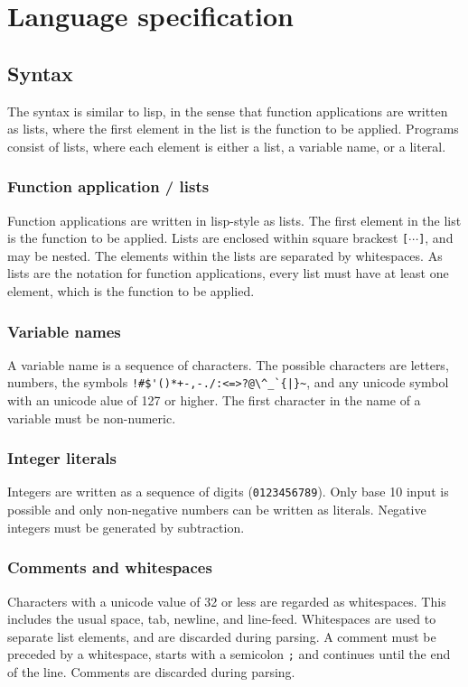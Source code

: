 \documentclass[11pt]{report}
\begin{document}
\section{Language specification}

\subsection{Syntax}
The syntax is similar to lisp, in the sense that function applications are written as lists, where the first element in the list is the function to be applied.
Programs consist of lists, where each element is either a list, a variable name, or a literal.

\subsubsection{Function application / lists}
Function applications are written in lisp-style as lists. The first element in the list is the function to be applied.
Lists are enclosed within square brackest \verb|[|$\cdots$\verb|]|, and may be nested. The elements within the lists are separated by whitespaces. 
As lists are the notation for function applications, every list must have at least one element, which is the function to be applied.

\subsubsection{Variable names}
A variable name is a sequence of characters. The possible characters are letters, numbers, the symbols \verb"!#$'()*+-,-./:<=>?@\^_`{|}~", and any unicode symbol with an unicode alue of 127 or higher. The first character in the name of a variable must be non-numeric.

\subsubsection{Integer literals}

Integers are written as a sequence of digits (\verb|0123456789|). Only base 10 input is possible and only non-negative numbers can be written as literals. Negative integers must be generated by subtraction.

\subsubsection{Comments and whitespaces}
Characters with a unicode value of 32 or less are regarded as whitespaces. This includes the usual space, tab, newline, and line-feed. Whitespaces are used to separate list elements, and are discarded during parsing. A comment must be preceded by a whitespace, starts with a semicolon \verb|;| and continues until the end of the line. Comments are discarded during parsing.
\end{document}
